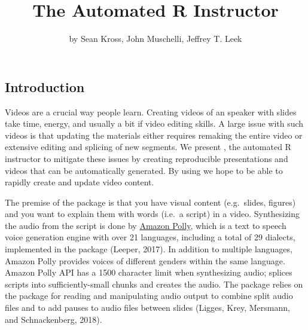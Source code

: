 \title{The Automated R Instructor}
\author{by Sean Kross, John Muschelli, Jeffrey T. Leek}

\maketitle



\hypertarget{introduction}{%
\subsection{Introduction}\label{introduction}}

Videos are a crucial way people learn. Creating videos of an speaker
with slides take time, energy, and usually a bit if video editing
skills. A large issue with such videos is that updating the materials
either requires remaking the entire video or extensive editing and
splicing of new segments. We present , the automated R
instructor to mitigate these issues by creating reproducible
presentations and videos that can be automatically generated. By using
 we hope to be able to rapidly create and update video content.

The premise of the  package is that you have visual content
(e.g.~slides, figures) and you want to explain them with words (i.e.~a
script) in a video. Synthesizing the audio from the script is done by
\href{https://aws.amazon.com/polly/}{Amazon Polly}, which is a text to
speech voice generation engine with over 21 languages, including a total
of 29 dialects, implemented in the  package (Leeper,
2017). In addition to multiple languages, Amazon Polly provides voices
of different genders within the same language. Amazon Polly API has a
1500 character limit when synthesizing audio;  splices scripts
into sufficiently-small chunks and creates the audio. The 
package relies on the  package for reading and
manipulating audio output to combine split audio files and to add pauses
to audio files between slides (Ligges, Krey, Mersmann, and
Schnackenberg, 2018).


